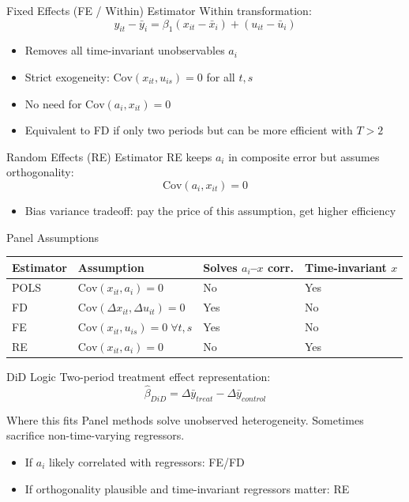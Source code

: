 \documentclass[aspectratio=169]{beamer}
\begin{document}
\begin{frame}{Fixed Effects (FE / Within) Estimator}
Within transformation:
\[
y_{it}-\bar y_i = \beta_1(x_{it}-\bar x_i) + (u_{it}-\bar u_i)
\]
\begin{itemize}
	\item Removes all time-invariant unobservables $a_i$
	\item Strict exogeneity: $\mathrm{Cov}(x_{it},u_{is})=0$ for all $t,s$
	\item No need for $\mathrm{Cov}(a_i,x_{it})=0$
	\item Equivalent to FD if only two periods but can be more efficient with $T>2$
\end{itemize}
\end{frame}

\begin{frame}{Random Effects (RE) Estimator}
RE keeps $a_i$ in composite error but assumes orthogonality:
\[
\mathrm{Cov}(a_i,x_{it})=0
\]
\begin{itemize}
	\item Bias variance tradeoff: pay the price of this assumption, get higher efficiency
\end{itemize}
\end{frame}

\begin{frame}{Panel Assumptions}
\small
\begin{center}
\begin{tabular}{llll}
\toprule
Estimator & Assumption & Solves $a_i$--$x$ corr. & Time-invariant $x$ \\
\midrule
POLS & $\mathrm{Cov}(x_{it},a_i)=0$ & No & Yes \\
FD & $\mathrm{Cov}(\Delta x_{it},\Delta u_{it})=0$ & Yes & No \\
FE & $\mathrm{Cov}(x_{it},u_{is})=0\;\forall t,s$ & Yes & No \\
RE & $\mathrm{Cov}(x_{it},a_i)=0$ & No & Yes \\
\bottomrule
\end{tabular}
\end{center}
\normalsize
\end{frame}

\begin{frame}{DiD Logic}
Two-period treatment effect representation:
\[
\hat\beta_{DiD} = \Delta \bar y_{treat} - \Delta \bar y_{control}
\]
\end{frame}

\begin{frame}{}
\begin{block}{Where this fits}
Panel methods solve unobserved heterogeneity. Sometimes sacrifice non-time-varying regressors.
\begin{itemize}
	\item If $a_i$ likely correlated with regressors: FE/FD
	\item If orthogonality plausible and time-invariant regressors matter: RE
\end{itemize}
\end{block}
\end{frame}
\end{document}
